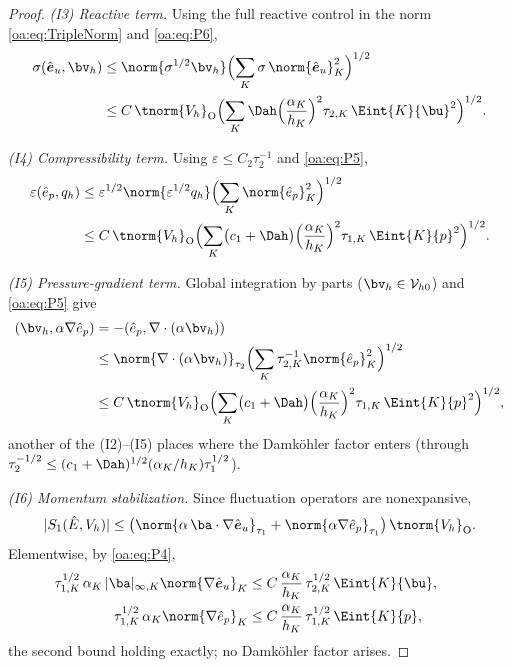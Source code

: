 \begin{proof}
\smallskip\noindent
\emph{(I3) Reactive term.} Using the full reactive control in the norm
\cref{oa:eq:TripleNorm} and \cref{oa:eq:P6},
\[
\begin{aligned}
  \sigma(\hat{\boldsymbol e}_u, \bv_h)
  &\le \norm{\sigma^{1/2}\bv_h}\Bigl( \sum_K \sigma\,
  \norm{\hat{\boldsymbol e}_u}_K^2 \Bigr)^{1/2} \\
  &\le C\,\tnorm{V_h}_{\mathrm{O}}\Bigl( \sum_K \Dah
  \Bigl(\frac{\alpha_K}{h_K}\Bigr)^2\tau_{2,K}\,\Eint{K}{\bu}^2 \Bigr)^{1/2}.
\end{aligned}
\]

\smallskip\noindent
\emph{(I4) Compressibility term.} Using $\varepsilon \le C_2\tau_2^{-1}$ and
\cref{oa:eq:P5},
\[
\begin{aligned}
  \varepsilon(\hat e_p, q_h)
  &\le \varepsilon^{1/2}\norm{\varepsilon^{1/2}q_h}
  \Bigl( \sum_K \norm{\hat e_p}_K^2 \Bigr)^{1/2} \\
  &\le C\,\tnorm{V_h}_{\mathrm{O}}\Bigl( \sum_K \bigl(c_1+\Dah\bigr)
  \Bigl(\frac{\alpha_K}{h_K}\Bigr)^2\tau_{1,K}\,\Eint{K}{p}^2 \Bigr)^{1/2}.
\end{aligned}
\]

\smallskip\noindent
\emph{(I5) Pressure-gradient term.} Global integration by parts
($\bv_h \in \mathcal{V}_{h0}$) and \cref{oa:eq:P5} give
\[
\begin{aligned}
  (\bv_h, \alpha\nabla\hat e_p)
  &= -(\hat e_p, \nabla\cdot(\alpha\bv_h)) \\
  &\le \norm{\nabla\cdot(\alpha\bv_h)}_{\tau_2}
  \Bigl( \sum_K \tau_{2,K}^{-1}\norm{\hat e_p}_K^2 \Bigr)^{1/2} \\
  &\le C\,\tnorm{V_h}_{\mathrm{O}}\Bigl( \sum_K \bigl(c_1+\Dah\bigr)
  \Bigl(\frac{\alpha_K}{h_K}\Bigr)^2\tau_{1,K}\,\Eint{K}{p}^2 \Bigr)^{1/2},
\end{aligned}
\]
another of the (I2)--(I5) places where the Damk\"ohler factor enters (through
$\tau_2^{-1/2} \le (c_1+\Dah)^{1/2}(\alpha_K/h_K)\tau_1^{1/2}$).

\smallskip\noindent
\emph{(I6) Momentum stabilization.} Since fluctuation operators are nonexpansive,
\[
  |S_1(\hat E, V_h)|
  \le \bigl( \norm{\alpha\,\ba\cdot\nabla\hat{\boldsymbol e}_u}_{\tau_1}
  + \norm{\alpha\nabla\hat e_p}_{\tau_1} \bigr)\,\tnorm{V_h}_{\mathrm{O}}.
\]
Elementwise, by \cref{oa:eq:P4},
\[
\begin{aligned}
  \tau_{1,K}^{1/2}\,\alpha_K\,|\ba|_{\infty,K}\norm{\nabla\hat{\boldsymbol e}_u}_K
  &\le C\,\frac{\alpha_K}{h_K}\,\tau_{2,K}^{1/2}\,\Eint{K}{\bu},
  \qquad \\
  \tau_{1,K}^{1/2}\,\alpha_K\norm{\nabla\hat e_p}_K
  &\le C\,\frac{\alpha_K}{h_K}\,\tau_{1,K}^{1/2}\,\Eint{K}{p},
\end{aligned}
\]
the second bound holding exactly; no Damk\"ohler factor arises.


\end{proof}
